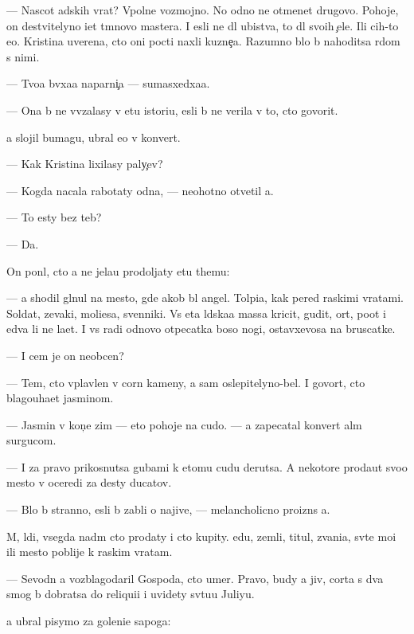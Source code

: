 \documentclass[10pt]{book}
\begin{document}
— Nascot adskih vrat? Vpolne vozmojno. No odno ne otmen{\ia}{\y}et drugovo. Pohoje, on de{\y}stvitelyno i{\x}et t{\e}mnovo mastera. I {\y}esli ne dl{\ia} ubi{\y}stva, to dl{\ia} svo{\y}ih {\c}ele{\y}. Ili c{\yf}ih-to {\y}e{\x}o. Kristina uverena, cto oni pocti naxli kuzne{\c}a. Razumno b{\yi}lo b{\yi} nahoditsa r{\ia}dom s nimi.

— Tvo{\y}a b{\yi}vxa{\y}a naparni{\c}a — sumasxedxa{\y}a.

— Ona b{\yi} ne vv{\ia}zalasy v etu istori{\y}u, {\y}esli b{\yi} ne verila v to, cto govorit.

{\Y}a slojil bumagu, ubral {\y}e{\y}o v konvert.

— Kak Kristina lixilasy paly{\c}ev?

— Kogda nacala rabotaty odna, — neohotno otvetil {\y}a.

— To {\y}esty bez teb{\ia}?

— Da.

On pon{\ia}l, cto {\y}a ne jela{\y}u prodoljaty etu themu:

— {\Y}a shodil gl{\ia}nul na mesto, gde {\y}akob{\yi} b{\yi}l angel. Tolpi{\x}a, kak pered ra{\y}skimi vratami. Soldat{\yi}, zevaki, mol{\ia}{\x}i{\y}esa, sv{\ia}{\x}enniki. Vs{\ia} eta l{\io}dska{\y}a massa kricit, gudit, or{\e}t, po{\y}ot i {\y}edva li ne la{\y}et. I vs{\e} radi odnovo otpecatka boso{\y} nogi, ostavxevosa na bruscatke.

— I cem je on neob{\yi}cen?

— Tem, cto vplavlen v corn{\yi}{\y} kameny, a sam oslepitelyno-bel. I govor{\ia}t, cto blagouha{\y}et jasminom.

— Jasmin v kon{\c}e zim{\yi} — eto pohoje na cudo. — {\Y}a zapecatal konvert al{\yi}m surgucom.

— I za pravo prikosnutsa gubami k etomu cudu derutsa. A nekotor{\yi}{\y}e proda{\y}ut svo{\y}o mesto v oceredi za des{\ia}ty ducatov.

— B{\yi}lo b{\yi} stranno, {\y}esli b{\yi} zab{\yi}li o najive, — melancholicno proizn{\e}s {\y}a.

M{\yi}, l{\io}di, vsegda na{\y}d{\e}m cto prodaty i cto kupity. {\Y}edu, zemli, titul{\yi}, zvani{\y}a, sv{\ia}t{\yi}{\y}e mo{\x}i ili mesto poblije k ra{\y}skim vratam.

— Sevodn{\ia} {\y}a vozblagodaril Gospoda, cto umer. Pravo, budy {\y}a jiv, corta s dva smog b{\yi} dobratsa do reliqui{\y}i i uvidety sv{\ia}tu{\y}u Juliyu.

{\Y}a ubral pisymo za goleni{\x}e sapoga:
\end{document}
